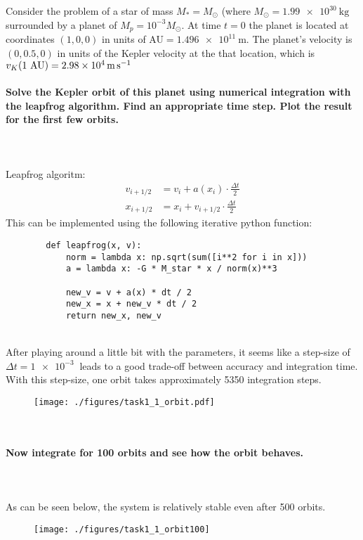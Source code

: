 Consider the problem of a star of mass $M_*=M_\odot$ (where 
$M_\odot=\SI{1.99e30}{\kilogram}$ surrounded by a planet of 
$M_p=10^{-3} M_\odot$. At time $t=0$ the planet is located at 
coordinates $(1,0,0)$ in units of AU$=\SI{1.496e11}{\meter}$. The 
planet's velocity is $(0,0.5,0)$ in units of the Kepler velocity at the 
that location, which is 
$v_K(1\textnormal{ AU})=\SI{2.98e4}{\meter\per\second}$

\paragraph{Solve the Kepler orbit of this planet using numerical
    integration with the leapfrog algorithm. Find an appropriate 
    time step. Plot the result for the first few orbits.
} \ \\
\\
    Leapfrog algoritm:
    \begin{align}
        v_{i+1/2}&=v_i+a(x_i)\cdot\frac{\Delta t}{2} \\
        x_{i+1/2}&=x_{i}+v_{i+1/2}\cdot\frac{\Delta t}{2}
    \end{align}
    This can be implemented using the following iterative python function:
    \begin{lstlisting}
        def leapfrog(x, v):
            norm = lambda x: np.sqrt(sum([i**2 for i in x]))
            a = lambda x: -G * M_star * x / norm(x)**3
        
            new_v = v + a(x) * dt / 2
            new_x = x + new_v * dt / 2
            return new_x, new_v
    \end{lstlisting} \ \\
    After playing around a little bit with the parameters, it seems like 
    a step-size of $\Delta t=\SI{1e-3}{}$ leads to a good trade-off between 
    accuracy and integration time. With this step-size, one orbit takes 
    approximately 5350 integration steps.
    \begin{figure}[h!]
        \centering
        \texttt{[image: ./figures/task1\_1\_orbit.pdf]}
    \end{figure} \ \\ 

\newpage
\paragraph{Now integrate for 100 orbits and see how the orbit behaves.} \ \\
\\
    As can be seen below, the system is relatively stable even after 500 orbits.
    \begin{figure}[h!]
        \centering
        \texttt{[image: ./figures/task1\_1\_orbit100]}
    \end{figure} \ \\ 

